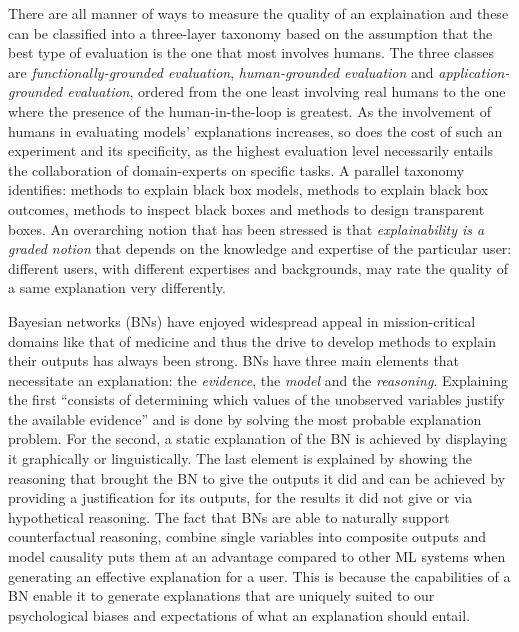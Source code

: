 There are all manner of ways to measure the quality of an explaination and these can be classified into a three-layer taxonomy \citep{doshi2017towards} based on the assumption that the best type of evaluation is the one that most involves humans.
The three classes are \textit{functionally-grounded evaluation}, \textit{human-grounded evaluation} and \textit{application-grounded evaluation}, ordered from the one least involving real humans to the one where the presence of the human-in-the-loop is greatest.
As the involvement of humans in evaluating models' explanations increases, so does the cost of such an experiment and its specificity, as the highest evaluation level necessarily entails the collaboration of domain-experts on specific tasks.
A parallel taxonomy identifies: methods to explain black box models, methods to explain black box outcomes, methods to inspect black boxes and methods to design transparent boxes.
An overarching notion that has been stressed is that \textit{explainability is a graded notion} that depends on the knowledge and expertise of the particular user: different users, with different expertises and backgrounds, may rate the quality of a same explanation very differently.

Bayesian networks (BNs) have enjoyed widespread appeal in mission-critical domains like that of medicine and thus the drive to develop methods to explain their outputs has always been strong.
BNs have three main elements that necessitate an explanation: the \textit{evidence}, the \textit{model} and the \textit{reasoning}. \citep{lacave2002review}
Explaining the first \enquote{consists of determining which values of the unobserved variables justify the available evidence} and is done by solving the most probable explanation problem.
For the second, a static explanation of the BN is achieved by displaying it graphically or linguistically.
The last element is explained by showing the reasoning that brought the BN to give the outputs it did and can be achieved by providing a justification for its outputs, for the results it did not give or via hypothetical reasoning.
The fact that BNs are able to naturally support counterfactual reasoning, combine single variables into composite outputs and model causality puts them at an advantage compared to other ML systems when generating an effective explanation for a user.
This is because the capabilities of a BN enable it to generate explanations that are uniquely suited to our psychological biases and expectations of what an explanation should entail.


